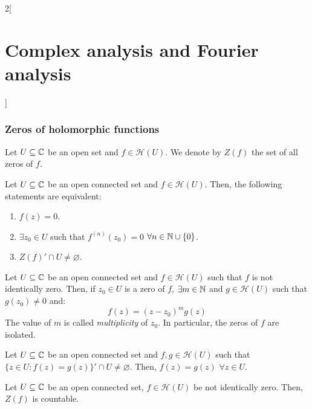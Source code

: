 \documentclass[../../../main.tex]{subfiles}
\begin{document}
\begin{multicols}{2}[\section{Complex analysis and Fourier analysis}]
  \subsubsection{Zeros of holomorphic functions}
  \begin{definition}
    Let $U\subseteq\mathbb{C}$ be an open set and $f\in\mathcal{H}(U)$. We denote by $Z(f)$ the set of all zeros of $f$.
  \end{definition}
  \begin{theorem}
    Let $U\subseteq\mathbb{C}$ be an open connected set and $f\in\mathcal{H}(U)$. Then, the following statements are equivalent:
    \begin{enumerate}
      \item $f(z)=0$.
      \item $\exists z_0\in U$ such that $f^{(n)}(z_0)=0$ $\forall n\in\mathbb{N}\cup\{0\}$.
      \item ${Z(f)}'\cap U\ne\varnothing$.
    \end{enumerate}
  \end{theorem}
  \begin{corollary}
    Let $U\subseteq\mathbb{C}$ be an open connected set and $f\in\mathcal{H}(U)$ such that $f$ is not identically zero. Then, if $z_0\in U$ is a zero of $f$, $\exists m\in\mathbb{N}$ and $g\in\mathcal{H}(U)$ such that $g(z_0)\ne 0$ and: $$f(z)={(z-z_0)}^{m}g(z)$$ The value of $m$ is called \emph{multiplicity} of $z_0$. In particular, the zeros of $f$ are isolated.
  \end{corollary}
  \begin{theorem}
    Let $U\subseteq\mathbb{C}$ be an open connected set and $f,g\in\mathcal{H}(U)$ such that ${\{z\in U:f(z)=g(z)\}}'\cap U\ne\varnothing$. Then, $f(z)=g(z)$ $\forall z\in U$.
  \end{theorem}
  \begin{corollary}
    Let $U\subseteq\mathbb{C}$ be an open connected set, $f\in\mathcal{H}(U)$ be not identically zero. Then, $Z(f)$ is countable.
  \end{corollary}

\end{multicols}
\end{document}
